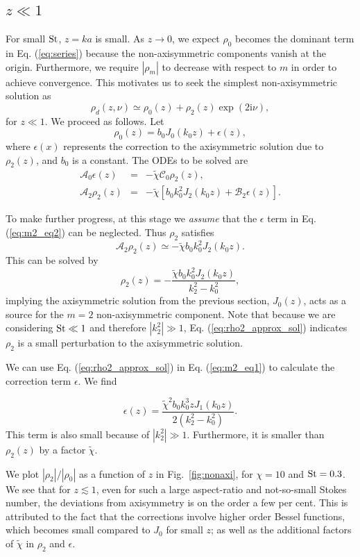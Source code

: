 \documentclass[apj]{emulateapj}
\newcommand{\Eq}[1]{Eq. (\ref{#1})}
\newcommand{\eq}[1]{\Eq{#1}}
\newcommand{\Fig}[1]{Fig.~\ref{#1}}
\newcommand{\fig}[1]{\Fig{#1}}
\newcommand{\beq}{\begin{equation}}
\newcommand{\eeq}{\end{equation}}
\newcommand{\beqn}{\begin{eqnarray}}
\newcommand{\eeqn}{\end{eqnarray}}
\newcommand{\St}{{\rm St}}
\begin{document}
\subsection{$z\ll 1$}
For small $\St$, $z=ka$ is small. As $z\to 0$, we expect $\rho_0$
becomes the dominant term in \eq{eq:series} because the
non-axisymmetric components vanish at the origin. Furthermore, we
require $|\rho_m|$ to decrease with respect to $m$ in order to achieve
convergence. This motivates us to seek the simplest non-axisymmetric solution as  
\beq
\rho_d(z,\nu) \simeq \rho_0(z) + \rho_2(z)\exp{\left(2\mathrm{i}\nu\right)},  
\eeq
for $z\ll 1$. We proceed as follows. Let
\beq
\rho_0(z) = b_0J_0(k_0z) + \epsilon(z),  
\eeq
where $\epsilon(x)$ represents the correction to the axisymmetric
solution due to $\rho_2(z)$, and $b_0$ is a constant. The ODEs to be
solved are 
\beqn 
\mathcal{A}_0\epsilon(z) &=& -\tilde{\chi}\mathcal{C}_0\rho_2(z),\label{eq:m2_eq1}\\
\mathcal{A}_2\rho_2(z) &=& -\tilde{\chi}\left[b_0k_0^2J_2(k_0z) +
  \mathcal{B}_2\epsilon(z)\right].\label{eq:m2_eq2} 
\eeqn

To make further progress, at this stage we \emph{assume} that the
$\epsilon$ term in \eq{eq:m2_eq2} can be neglected. Thus $\rho_2$ satisfies
\beq\label{eq:rho2_approx}
\mathcal{A}_2\rho_2(z) \simeq -\tilde{\chi}b_0k_0^2J_2(k_0z).
\eeq
This can be solved by 
\beq\label{eq:rho2_approx_sol}
\rho_2(z)  = -\frac{\tilde{\chi}b_0k_0^2J_2(k_0z)}{k_2^2 - k_0^2}, 
\eeq
implying the axisymmetric solution from the previous section, 
$J_0(z)$, acts as a source for the $m=2$ non-axisymmetric
component. Note that because we are considering $\St\ll1$ and
therefore $|k_2^2|\gg1$, \eq{eq:rho2_approx_sol} indicates $\rho_2$
is a small perturbation to the axisymmetric solution.     

We can use \eq{eq:rho2_approx_sol} in \eq{eq:m2_eq1} to
calculate the correction term $\epsilon$. We find 

\beq
\epsilon(z) = \frac{\tilde{\chi}^2b_0k_0^3zJ_1(k_0z)}{2\left(k_2^2 -
  k_0^2\right)}. 
\eeq
This term is also small because of $|k_2^2|\gg1$. Furthermore, it is
smaller than $\rho_2(z)$ by a factor $\tilde{\chi}$.  

We plot $|\rho_2|/|\rho_0|$ as a function of $z$ in \fig{fig:nonaxi}, 
for $\chi=10$ and $\St=0.3$. We see that for $z\lesssim 1$, even 
for such a large aspect-ratio and not-so-small Stokes number, the
deviations from axisymmetry is on the order a few per cent. This is attributed to the fact
that the corrections involve higher order Bessel functions, which
becomes small compared to $J_0$ for small $z$; as well as the
additional factors of $\tilde{\chi}$ in $\rho_2$ and $\epsilon$.   
\end{document}
